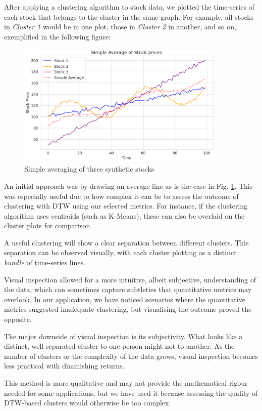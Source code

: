 \documentclass[11pt]{article}
\begin{document}
After applying a clustering algorithm to stock data, we plotted the time-series of each stock that belongs to the cluster in the same graph. For example, all stocks in \textit{Cluster 1} would be in one plot, those in \textit{Cluster 2} in another, and so on, exemplified in the following figure:

\begin{figure}[H] 
\centering
\includegraphics[width=10cm]{img/simple-average.png} 
\caption{Simple averaging of three synthetic stocks}
\label{fig:simple-average}
\end{figure}

An initial approach was by drawing an average line as is the case in Fig. \ref{fig:simple-average}. This was especially useful due to how complex it can be to assess the outcome of clustering with DTW using our selected metrics. For instance, if the clustering algorithm uses centroids (such as K-Means), these can also be overlaid on the cluster plots for comparison. 

A useful clustering will show a clear separation between different clusters. This separation can be observed visually, with each cluster plotting as a distinct \textit{bundle} of time-series lines.

Visual inspection allowed for a more intuitive, albeit subjective, understanding of the data, which can sometimes capture subtleties that quantitative metrics may overlook. In our application, we have noticed scenarios where the quantitative metrics suggested inadequate clustering, but visualising the outcome proved the opposite.

The major downside of visual inspection is its subjectivity. What looks like a distinct, well-separated cluster to one person might not to another. As the number of clusters or the complexity of the data grows, visual inspection becomes less practical with diminishing returns.

This method is more qualitative and may not provide the mathematical rigour needed for some applications, but we have used it because assessing the quality of DTW-based clusters would otherwise be too complex. 
\end{document}
